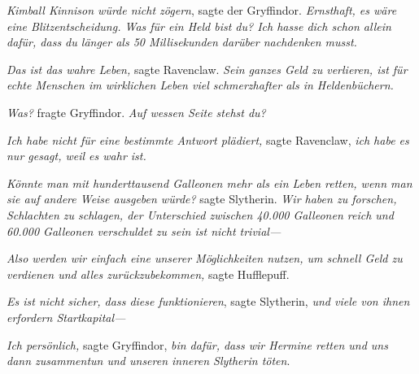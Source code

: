 \emph{Kimball Kinnison würde nicht zögern}, sagte der Gryffindor. \emph{Ernsthaft, es wäre eine Blitzentscheidung. Was für ein Held bist du? Ich hasse dich schon allein dafür, dass du länger als 50 Millisekunden darüber nachdenken musst.}

\emph{Das ist das wahre Leben,} sagte Ravenclaw. \emph{Sein ganzes Geld zu verlieren, ist für echte Menschen im wirklichen Leben viel schmerzhafter als in Heldenbüchern.}

\emph{Was?} fragte Gryffindor. \emph{Auf wessen Seite stehst du?}

\emph{Ich habe nicht für eine bestimmte Antwort plädiert,} sagte Ravenclaw, \emph{ich habe es nur gesagt, weil es wahr ist.}

\emph{Könnte man mit hunderttausend Galleonen mehr als ein Leben retten, wenn man sie auf andere Weise ausgeben würde?} sagte Slytherin. \emph{Wir haben zu forschen, Schlachten zu schlagen, der Unterschied zwischen 40.000 Galleonen reich und 60.000 Galleonen verschuldet zu sein ist nicht trivial—}

\emph{Also werden wir einfach eine unserer Möglichkeiten nutzen, um schnell Geld zu verdienen und alles zurückzubekommen,} sagte Hufflepuff.

\emph{Es ist nicht sicher, dass diese funktionieren}, sagte Slytherin, \emph{und viele von ihnen erfordern Startkapital—}

\emph{Ich persönlich,} sagte Gryffindor, \emph{bin dafür, dass wir Hermine retten und uns dann zusammentun und unseren inneren Slytherin töten}.

